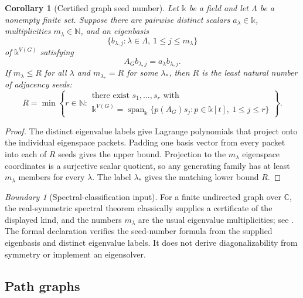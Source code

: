 \documentclass[11pt]{article}
\newtheorem{corollary}[theorem]{Corollary}
\theoremstyle{definition}
\theoremstyle{remark}
\newtheorem{boundary}[theorem]{Boundary}
\newcommand{\Span}{\operatorname{span}}
\newcommand{\bbk}{\mathbb{k}}
\newcommand{\N}{\mathbb N}
\newcommand{\C}{\mathbb C}
\begin{document}
\begin{corollary}[Certified graph seed number]
\label{cor:graph-rank}
Let $\bbk$ be a field and let $\Lambda$ be a nonempty finite set.  Suppose
there are pairwise distinct scalars $a_{\lambda}\in\bbk$, multiplicities
$m_{\lambda}\in\N$, and an eigenbasis
\[
\{b_{\lambda,j}:\lambda\in\Lambda,\ 1\le j\le m_{\lambda}\}
\]
of $\bbk^{V(G)}$ satisfying
\[
A_Gb_{\lambda,j}=a_{\lambda}b_{\lambda,j}.
\]
If $m_{\lambda}\le R$ for all $\lambda$ and
$m_{\lambda_*}=R$ for some $\lambda_*$, then $R$ is the least natural number
of adjacency seeds:
\[
\boxed{
R=\min\left\{r\in\N:
\begin{array}{l}
\text{there exist }s_1,\ldots,s_r\text{ with}\\[2pt]
\bbk^{V(G)}=\Span_{\bbk}
  \{p(A_G)s_j:p\in\bbk[t],\ 1\le j\le r\}
\end{array}
\right\}.
}
\]
\end{corollary}

\begin{proof}
The distinct eigenvalue labels give Lagrange polynomials that project onto
the individual eigenspace packets.  Padding one basis vector from every
packet into each of $R$ seeds gives the upper bound.  Projection to the
$m_{\lambda}$ eigenspace coordinates is a surjective scalar quotient, so any
generating family has at least $m_{\lambda}$ members for every $\lambda$.
The label $\lambda_*$ gives the matching lower bound $R$.
\end{proof}

\begin{boundary}[Spectral-classification input]
For a finite undirected graph over $\C$, the real-symmetric spectral theorem
classically supplies a certificate of the displayed kind, and the numbers
$m_{\lambda}$ are the usual eigenvalue multiplicities; see
\cite[Chs.~1--2]{brouwerHaemers2012}.  The formal declaration verifies the
seed-number formula from the supplied eigenbasis and distinct eigenvalue
labels.  It does not derive diagonalizability from symmetry or implement an
eigensolver.
\end{boundary}

\subsection{Path graphs}
\end{document}
